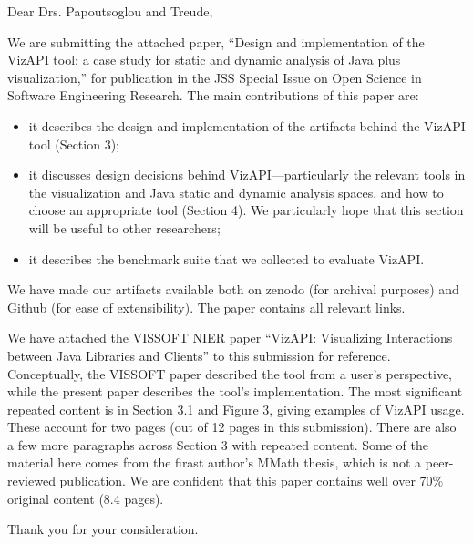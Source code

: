 \documentclass{letter}
\begin{document}
\begin{letter}{}
\opening{Dear Drs. Papoutsoglou and Treude,}

We are submitting the attached paper, ``Design and implementation of the VizAPI tool: a case study for static and dynamic analysis of Java plus visualization,'' for publication in the JSS Special Issue on Open Science in Software Engineering Research. The main contributions of this paper are:
\begin{itemize}
\item it describes the design and implementation of the artifacts behind the VizAPI tool (Section 3);
\item it discusses design decisions behind VizAPI---particularly the relevant tools in the visualization and Java static and dynamic analysis spaces, and how to choose an appropriate tool (Section 4).
We particularly hope that this section will be useful to other researchers;
\item it describes the benchmark suite that we collected to evaluate VizAPI.
\end{itemize}

We have made our artifacts available both on zenodo (for archival
purposes) and Github (for ease of extensibility). The paper contains
all relevant links.

We have attached the VISSOFT NIER paper ``VizAPI: Visualizing
Interactions between Java Libraries and Clients'' to this submission
for reference. Conceptually, the VISSOFT paper described the tool from
a user's perspective, while the present paper describes the tool's
implementation. The most significant repeated content is in Section
3.1 and Figure 3, giving examples of VizAPI usage. These account for
two pages (out of 12 pages in this submission). There are also a few
more paragraphs across Section 3 with repeated content. Some of the
material here comes from the firast author's MMath thesis, which is
not a peer-reviewed publication. We are confident that this paper
contains well over 70\% original content (8.4 pages).

\closing{Thank you for your consideration.}

%
%

\end{letter} 
\end{document}
